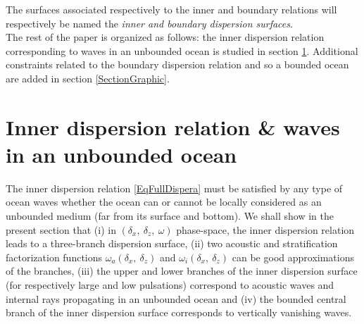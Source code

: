 \documentclass[a4paper,11pt]{article}
\begin{document}
The surfaces associated respectively to the inner and boundary relations will respectively be named the \textit{inner and boundary dispersion surfaces}.\\
The rest of the paper is organized as follows: the inner dispersion relation corresponding to waves in an unbounded ocean is studied in section \ref{SectionInner}. Additional constraints related to the boundary dispersion relation and so a bounded ocean are added in section \ref{SectionGraphic}.

\newpage
\section{Inner dispersion relation \& waves in an unbounded ocean}
\label{SectionInner}
The inner dispersion relation \ref{EqFullDispera} must be satisfied by any type of ocean waves whether the ocean can or cannot be locally considered as an unbounded medium (far from its surface and bottom). We shall show in the present section that (i) in $(\delta_x,\  \delta_z,\ \omega)$ phase-space, the inner dispersion relation leads to a three-branch dispersion surface, (ii) two acoustic and stratification factorization functions $\omega_a(\delta_x,\ \delta_z)$ and $\omega_i(\delta_x,\ \delta_z)$ can be good approximations of the branches, (iii) the upper and lower branches of the inner dispersion surface (for respectively large and low pulsations) correspond to acoustic waves and internal rays propagating in an unbounded ocean and (iv) the bounded central branch of the inner dispersion surface corresponds to vertically vanishing waves.
\end{document}
